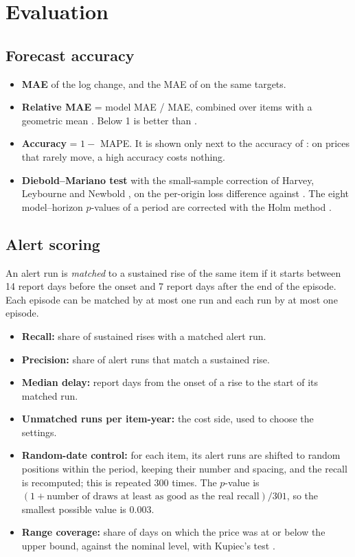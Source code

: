 \section{Evaluation}\label{sec:eval}

\subsection{Forecast accuracy}
\begin{itemize}[leftmargin=*,itemsep=2pt]
\item \textbf{MAE} of the log change, and the MAE of \naive{} on the same targets.
\item \textbf{Relative MAE} = model MAE / \naive{} MAE, combined over items with a geometric mean \cite{hk2006}. Below 1 is better than \naive{}.
\item \textbf{Accuracy} = $1 - $ MAPE. It is shown only next to the accuracy of \naive{}: on prices that rarely move, a high accuracy costs nothing.
\item \textbf{Diebold--Mariano test} \cite{dm1995} with the small-sample correction of Harvey, Leybourne and Newbold \cite{hln1997}, on the per-origin loss difference against \naive{}. The eight model--horizon $p$-values of a period are corrected with the Holm method \cite{holm1979}.
\end{itemize}

\subsection{Alert scoring}
An alert run is \emph{matched} to a sustained rise of the same item if it starts between 14 report days before the onset and 7 report days after the end of the episode. Each episode can be matched by at most one run and each run by at most one episode.
\begin{itemize}[leftmargin=*,itemsep=2pt]
\item \textbf{Recall:} share of sustained rises with a matched alert run.
\item \textbf{Precision:} share of alert runs that match a sustained rise.
\item \textbf{Median delay:} report days from the onset of a rise to the start of its matched run.
\item \textbf{Unmatched runs per item-year:} the cost side, used to choose the settings.
\item \textbf{Random-date control:} for each item, its alert runs are shifted to random positions within the period, keeping their number and spacing, and the recall is recomputed; this is repeated 300 times. The $p$-value is $(1 + \text{number of draws at least as good as the real recall}) / 301$, so the smallest possible value is $0.003$.
\item \textbf{Range coverage:} share of days on which the price was at or below the upper bound, against the nominal level, with Kupiec's test \cite{kupiec}.
\end{itemize}

